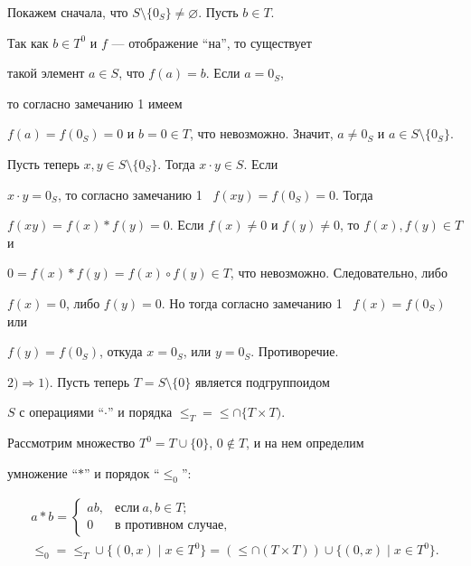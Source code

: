  


Покажем сначала, что $S\setminus\{0_S\}\ne\varnothing$. Пусть $b\in T$. 


Так как $b\in T^0$ и $f$ --- отображение ``на'', то существует


такой элемент $a\in S$, что $f(a)=b$. Если $a=0_S$,


то согласно замечанию 1 имеем 


$f(a)=f(0_S)=0$ и $b=0\in T$, что невозможно. Значит, $a\ne0_S$ и $a\in 


S\setminus\{0_S\}$. 


 


Пусть теперь $x,y\in S\setminus\{0_S\}$. Тогда $x\cdot y\in S$. Если 


$x\cdot y=0_S$, то согласно замечанию 1 \ $f(xy)=f(0_S)=0$. Тогда 


$f(xy)=f(x)*f(y)=0$. Если $f(x)\ne0$ и $f(y)\ne0$, то $f(x),f(y)\in T$ и 


$0=f(x)* f(y)=f(x)\circ f(y)\in T$, что невозможно. Следовательно, либо 


$f(x)=0$, либо $f(y)=0$. Но тогда согласно замечанию 1 \ $f(x)=f(0_S)$ или 


$f(y)=f(0_S)$, откуда $x=0_S$, или $y=0_S$. Противоречие. 


 


$2)\Rightarrow1)$. Пусть теперь $T=S\setminus\{0\}$ является подгруппоидом 


$S$ с операциями ``$\cdot$'' и порядка $\le_T =\le\cap\{T\times T)$. 


Рассмотрим множество $T^0=T\cup\{0\}$, $0\notin T$, и на нем определим 


умножение ``$*$'' и порядок ``$\le_0$'': 


\begin{gather*}


a*b=\begin{cases} 


ab, & \text{если} \ a,b\in T; \\ 


0 & \text{в противном случае},


\end{cases} 


\\ 


\le_0=\le_T\cup\{(0,x)\mid x\in T^0\}= 


(\le\cap(T\times T))\cup\{(0,x)\mid x\in T^0\}. 


\end{gather*}


